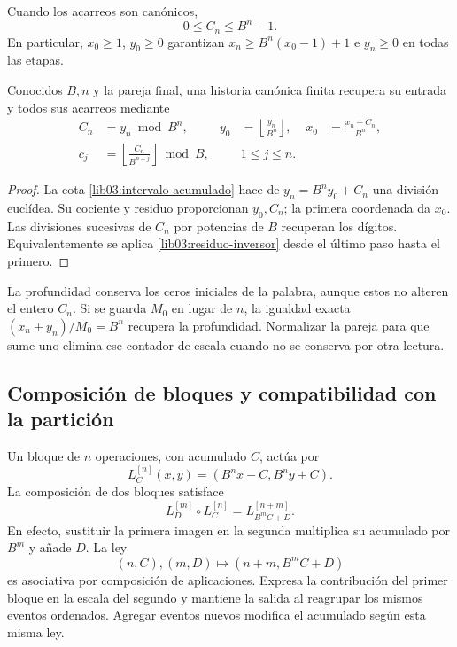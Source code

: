 Cuando los acarreos son canónicos,
\begin{equation}
 0\leq C_n\leq B^n-1.
 \label{lib03:intervalo-acumulado}
\end{equation}
En particular, \(x_0\geq1\), \(y_0\geq0\) garantizan
\(x_n\geq B^n(x_0-1)+1\) e \(y_n\geq0\) en todas las etapas.

\begin{corollary}
\label{lib03:cor-palabra}
Conocidos \(B,n\) y la pareja final, una historia canónica finita
recupera su entrada y todos sus acarreos mediante
\begin{align}
 C_n&=y_n\bmod B^n,&
 y_0&=\left\lfloor\frac{y_n}{B^n}\right\rfloor,&
 x_0&=\frac{x_n+C_n}{B^n},
 \label{lib03:recuperacion-inicial}\\
 c_j&=\left\lfloor\frac{C_n}{B^{n-j}}\right\rfloor\bmod B,
 &&1\leq j\leq n.
 \label{lib03:recuperacion-digitos}
\end{align}
\end{corollary}

\begin{proof}
La cota \eqref{lib03:intervalo-acumulado} hace de
\(y_n=B^ny_0+C_n\) una división euclídea. Su cociente y residuo
proporcionan \(y_0,C_n\); la primera coordenada da \(x_0\).
Las divisiones sucesivas de \(C_n\) por potencias de \(B\) recuperan
los dígitos. Equivalentemente se aplica
\eqref{lib03:residuo-inversor} desde el último paso hasta el primero.
\end{proof}

La profundidad conserva los ceros iniciales de la palabra, aunque estos
no alteren el entero \(C_n\). Si se guarda \(M_0\) en lugar de
\(n\), la igualdad exacta \((x_n+y_n)/M_0=B^n\) recupera la
profundidad. Normalizar la pareja para que sume uno elimina ese contador
de escala cuando no se conserva por otra lectura.

\subsection{Composición de bloques y compatibilidad con la partición}
\label{lib03:composicion}

Un bloque de \(n\) operaciones, con acumulado \(C\), actúa por
\begin{equation}
 L_C^{[n]}(x,y)=(B^nx-C,B^ny+C).
 \label{lib03:bloque}
\end{equation}
La composición de dos bloques satisface
\begin{equation}
 L_D^{[m]}\circ L_C^{[n]}=L_{B^mC+D}^{[n+m]}.
 \label{lib03:ley-bloques}
\end{equation}
En efecto, sustituir la primera imagen en la segunda multiplica su
acumulado por \(B^m\) y añade \(D\). La ley
\[
 (n,C),(m,D)\longmapsto(n+m,B^mC+D)
\]
es asociativa por composición de aplicaciones. Expresa la contribución
del primer bloque en la escala del segundo y mantiene la salida al
reagrupar los mismos eventos ordenados. Agregar eventos nuevos modifica
el acumulado según esta misma ley.

